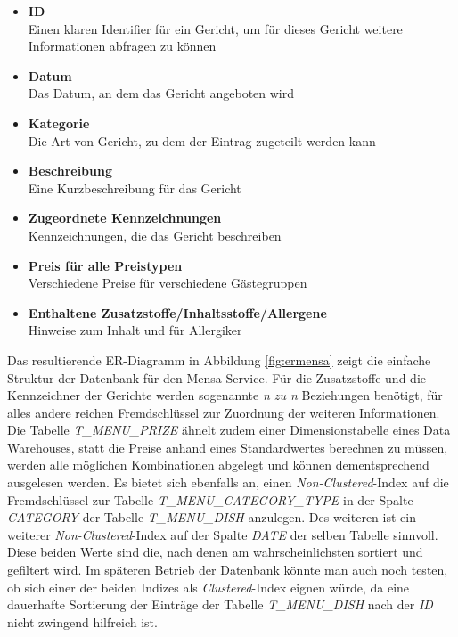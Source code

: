 \begin{itemize}
\item \textbf{ID} 
\\Einen klaren Identifier für ein Gericht, um für dieses Gericht weitere Informationen abfragen zu können
\item \textbf{Datum} 
\\Das Datum, an dem das Gericht angeboten wird
\item \textbf{Kategorie} 
\\Die Art von Gericht, zu dem der Eintrag zugeteilt werden kann
\item \textbf{Beschreibung} 
\\Eine Kurzbeschreibung für das Gericht
\item \textbf{Zugeordnete Kennzeichnungen} 
\\Kennzeichnungen, die das Gericht beschreiben
\item \textbf{Preis für alle Preistypen} 
\\Verschiedene Preise für verschiedene Gästegruppen
\item \textbf{Enthaltene Zusatzstoffe/Inhaltsstoffe/Allergene} 
\\Hinweise zum Inhalt und für Allergiker
\end{itemize}

Das resultierende \ac{ER}-Diagramm in Abbildung \ref{fig:ermensa} zeigt die einfache Struktur der Datenbank für den Mensa Service. Für die Zusatzstoffe und die Kennzeichner der Gerichte werden sogenannte \textit{n zu n} Beziehungen benötigt, für alles andere reichen Fremdschlüssel zur Zuordnung der weiteren Informationen. Die Tabelle \textit{T_MENU_PRIZE} ähnelt zudem einer Dimensionstabelle eines Data Warehouses, statt die Preise anhand eines Standardwertes berechnen zu müssen, werden alle möglichen Kombinationen abgelegt und können dementsprechend ausgelesen werden. Es bietet sich ebenfalls an, einen \textit{Non-Clustered}-Index auf die Fremdschlüssel zur Tabelle \textit{T_MENU\-_CATEGORY_TYPE} in der Spalte \textit{CATEGORY} der Tabelle \textit{T_MENU_DISH} anzulegen. Des weiteren ist ein weiterer \textit{Non-Clustered}-Index auf der Spalte \textit{DATE} der selben Tabelle sinnvoll. Diese beiden Werte sind die, nach denen am wahrscheinlichsten sortiert und gefiltert wird. Im späteren Betrieb der Datenbank könnte man auch noch testen, ob sich einer der beiden Indizes als \textit{Clustered}-Index eignen würde, da eine dauerhafte Sortierung der Einträge der Tabelle \textit{T_MENU_DISH} nach der \textit{ID} nicht zwingend hilfreich ist.


